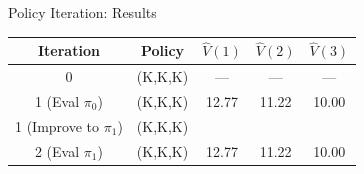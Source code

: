 \documentclass[10pt]{beamer}
\begin{document}
\begin{frame}{Policy Iteration: Results}
    \begin{table}
        \centering \small %
        \begin{tabular}{ccccc} %
            \toprule
            Iteration & Policy & $\hat{V}(1)$ & $\hat{V}(2)$ & $\hat{V}(3)$ \\
            \midrule
            0 & (K,K,K) & --- & --- & --- \\
            1 (Eval $\pi_0$) & (K,K,K) & 12.77 & 11.22 & 10.00 \\ %
            1 (Improve to $\pi_1$) & (K,K,K) & & & \\ %
            2 (Eval $\pi_1$) & (K,K,K) & 12.77 & 11.22 & 10.00 \\ %

\end{tabular}
\end{table}
\end{frame}
\end{document}
